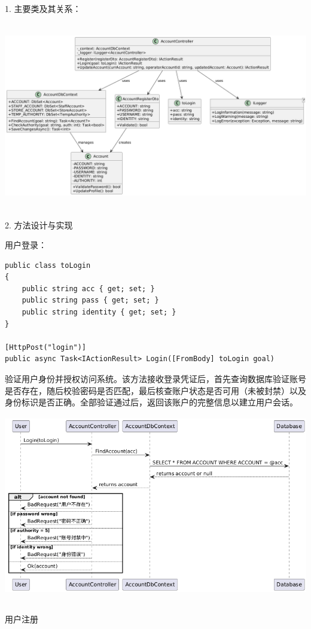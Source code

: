 \documentclass[]{article}
\begin{document}
1. 主要类及其关系：

\includegraphics[width=6.06528in,height=3.22222in]{media/media/image4.png}

2. 方法设计与实现

用户登录：
\begin{verbatim}
public class toLogin
{
    public string acc { get; set; }
    public string pass { get; set; }
    public string identity { get; set; }
}

[HttpPost("login")]
public async Task<IActionResult> Login([FromBody] toLogin goal)
\end{verbatim}

验证用户身份并授权访问系统。该方法接收登录凭证后，首先查询数据库验证账号是否存在，随后校验密码是否匹配，最后核查账户状态是否可用（未被封禁）以及身份标识是否正确。全部验证通过后，返回该账户的完整信息以建立用户会话。\includegraphics[width=5.88681in,height=3.37778in]{media/media/image5.png}

用户注册
\end{document}
